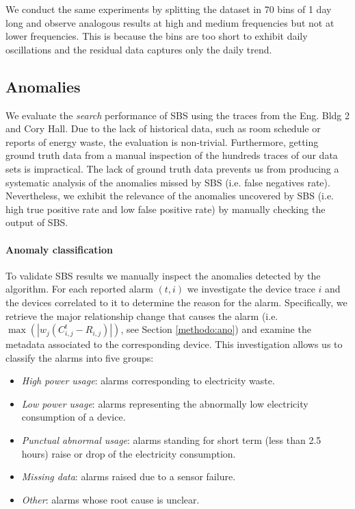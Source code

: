 We conduct the same experiments by splitting the dataset in 70 bins of 1 day long and observe analogous results at high and medium frequencies but not at lower frequencies.  This is because the bins are too short to exhibit daily oscillations and the residual data captures only the daily trend.


\subsection{Anomalies}
We evaluate the \emph{search} performance of SBS using the traces from the Eng. Bldg 2 and Cory Hall.
Due to the lack of historical data, such as room schedule or reports of energy waste, the evaluation is non-trivial.
Furthermore, getting ground truth data from a manual inspection of the hundreds traces of our data sets is impractical.
The lack of ground truth data prevents us from producing a systematic analysis of the anomalies missed by SBS (i.e. false negatives rate).
Nevertheless, we exhibit the relevance of the anomalies uncovered by SBS (i.e. high true positive rate and low false positive rate) by manually checking the output of SBS.

\paragraph{Anomaly classification}
To validate SBS results we manually inspect the anomalies detected by the algorithm.  
For each reported alarm $(t,i)$ we investigate the device trace $i$ and the devices correlated to it
to determine the reason for the alarm.
Specifically, we retrieve the major relationship change that causes the alarm (i.e. $\max(|w_j(C_{i,j}^t - R_{i,j})|)$, 
see Section \ref{methodo:ano}) and examine the metadata associated to the corresponding device.
This investigation allows us to classify the alarms into five groups:
\begin{itemize}
 \item \emph{High power usage}: alarms corresponding to electricity waste.
 \item \emph{Low power usage}: alarms representing the abnormally low electricity consumption of a device.
 \item \emph{Punctual abnormal usage}: alarms standing for short term (less than 2.5 hours) raise or drop of the electricity consumption.
 \item \emph{Missing data}: alarms raised due to a sensor failure.
 \item \emph{Other}: alarms whose root cause is unclear.
\end{itemize}

